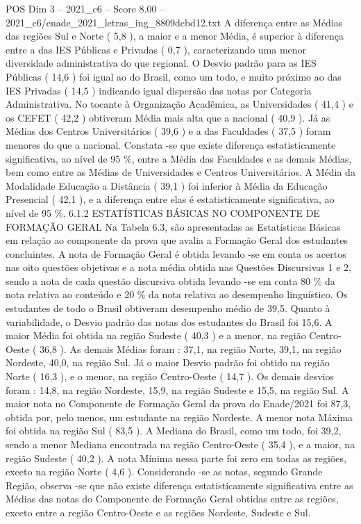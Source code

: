 \begin{textsample}{POS Dim 3 – 2021\_c6 – Score 8.00 – 2021\_c6/enade\_2021\_letras\_ing\_8809dcbd12.txt}
A diferença entre as Médias das regiões Sul e Norte ( 5,8 ), a maior e a menor Média, é superior à diferença entre a das IES Públicas e Privadas ( 0,7 ), caracterizando uma menor diversidade administrativa do que regional.
O Desvio padrão para as IES Públicas ( 14,6 ) foi igual ao do Brasil, como um todo, e muito próximo ao das IES Privadas ( 14,5 ) indicando igual dispersão das notas por Categoria Administrativa.
No tocante à Organização Acadêmica, as Universidades ( 41,4 ) e os CEFET ( 42,2 ) obtiveram Média mais alta que a nacional ( 40,9 ).
Já as Médias dos Centros Universitários ( 39,6 ) e a das Faculdades ( 37,5 ) foram menores do que a nacional.
Constata -se que existe diferença estatisticamente significativa, ao nível de 95 \%, entre a Média das Faculdades e as demais Médias, bem como entre as Médias de Universidades e Centros Universitários.
A Média da Modalidade Educação a Distância ( 39,1 ) foi inferior à Média da Educação Presencial ( 42,1 ), e a diferença entre elas é estatisticamente significativa, ao nível de 95 \%. 6.1.2 ESTATÍSTICAS BÁSICAS NO COMPONENTE DE FORMAÇÃO GERAL Na Tabela 6.3, são apresentadas as Estatísticas Básicas em relação ao componente da prova que avalia a Formação Geral dos estudantes concluintes.
A nota de Formação Geral é obtida levando -se em conta os acertos nas oito questões objetivas e a nota média obtida nas Questões Discursivas 1 e 2, sendo a nota de cada questão discursiva obtida levando -se em conta 80 \% da nota relativa ao conteúdo e 20 \% da nota relativa ao desempenho linguístico.
Os estudantes de todo o Brasil obtiveram desempenho médio de 39,5.
Quanto à variabilidade, o Desvio padrão das notas dos estudantes do Brasil foi 15,6.
A maior Média foi obtida na região Sudeste ( 40,3 ) e a menor, na região Centro-Oeste ( 36,8 ).
As demais Médias foram : 37,1, na região Norte, 39,1, na região Nordeste, 40,0, na região Sul.
Já o maior Desvio padrão foi obtido na região Norte ( 16,3 ), e o menor, na região Centro-Oeste ( 14,7 ).
Os demais desvios foram : 14,8, na região Nordeste, 15,9, na região Sudeste e 15,5, na região Sul.
A maior nota no Componente de Formação Geral da prova do Enade/2021 foi 87,3, obtida por, pelo menos, um estudante na região Nordeste.
A menor nota Máxima foi obtida na região Sul ( 83,5 ).
A Mediana do Brasil, como um todo, foi 39,2, sendo a menor Mediana encontrada na região Centro-Oeste ( 35,4 ), e a maior, na região Sudeste ( 40,2 ).
A nota Mínima nessa parte foi zero em todas as regiões, exceto na região Norte ( 4,6 ).
Considerando -se as notas, segundo Grande Região, observa -se que não existe diferença estatisticamente significativa entre as Médias das notas do Componente de Formação Geral obtidas entre as regiões, exceto entre a região Centro-Oeste e as regiões Nordeste, Sudeste e Sul.

\end{textsample}

